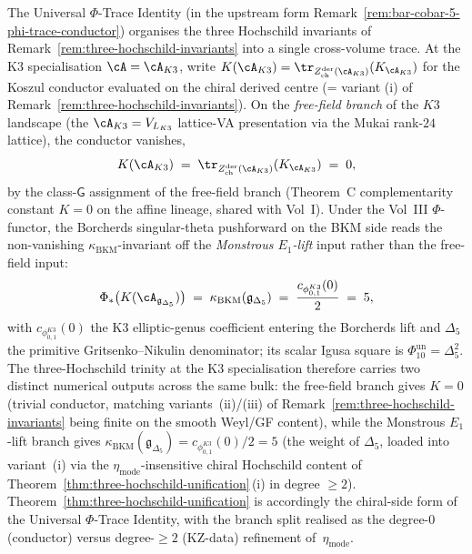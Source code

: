\begin{remark}
\label{rem:hoch-trinity-phi-trace}
%
%
%
The Universal $\Phi$-Trace Identity
(in the upstream form
Remark~\ref{rem:bar-cobar-5-phi-trace-conductor}) organises the
three Hochschild invariants of
Remark~\ref{rem:three-hochschild-invariants} into a single
cross-volume trace. At the K3 specialisation
$\cA=\cA_{K3}$, write
$K(\cA_{K3})=\tr_{Z^{\mathrm{der}}_{\mathrm{ch}}(\cA_{K3})}(K_{\cA_{K3}})$
for the Koszul conductor evaluated on the chiral derived centre
(= variant (i) of Remark~\ref{rem:three-hochschild-invariants}).
On the \emph{free-field branch} of the $K3$ landscape (the
$\cA_{K3}=V_{L_{K3}}$ lattice-VA presentation via the Mukai rank-$24$
lattice), the conductor vanishes,
\[
K(\cA_{K3})
\;=\;
\tr_{Z^{\mathrm{der}}_{\mathrm{ch}}(\cA_{K3})}(K_{\cA_{K3}})
\;=\;0,
\]
by the class-$\mathsf{G}$ assignment of the free-field branch
(Theorem~C complementarity constant $K=0$ on the affine lineage,
shared with Vol~I). Under the Vol~III $\Phi$-functor, the
Borcherds singular-theta pushforward on the BKM side reads the
non-vanishing $\kappa_{\mathrm{BKM}}$-invariant off the
\emph{Monstrous $E_1$-lift} input rather than the free-field input:
\[
\Phi_\ast\bigl(K(\cA_{\mathfrak{g}_{\Delta_5}})\bigr)
\;=\;
\kappa_{\mathrm{BKM}}(\mathfrak{g}_{\Delta_5})
\;=\;\frac{c_{\phi_{0,1}^{K3}}(0)}{2}\;=\;5,
\]
with $c_{\phi_{0,1}^{K3}}(0)$ the K3 elliptic-genus coefficient
entering the Borcherds lift and $\Delta_5$ the primitive
Gritsenko--Nikulin denominator; its scalar Igusa square is
$\Phi_{10}^{\mathrm{un}}=\Delta_5^2$.
The three-Hochschild trinity at the K3 specialisation
therefore carries two distinct numerical outputs across the same
bulk: the free-field branch gives $K=0$ (trivial conductor, matching
variants~(ii)/(iii) of Remark~\ref{rem:three-hochschild-invariants}
being finite on the smooth Weyl/GF content), while the Monstrous
$E_1$-lift branch gives
$\kappa_{\mathrm{BKM}}(\mathfrak g_{\Delta_5})=c_{\phi_{0,1}^{K3}}(0)/2=5$
(the weight of
$\Delta_5$, loaded into variant~(i) via the
$\eta_{\mathrm{mode}}$-insensitive chiral Hochschild content of
Theorem~\ref{thm:three-hochschild-unification}\,(i) in degree
$\geq 2$). Theorem~\ref{thm:three-hochschild-unification} is
accordingly the chiral-side form of the Universal
$\Phi$-Trace Identity, with the branch split realised as the
degree-$0$ (conductor) versus
degree-$\geq 2$ (KZ-data) refinement of~$\eta_{\mathrm{mode}}$.
\end{remark}

